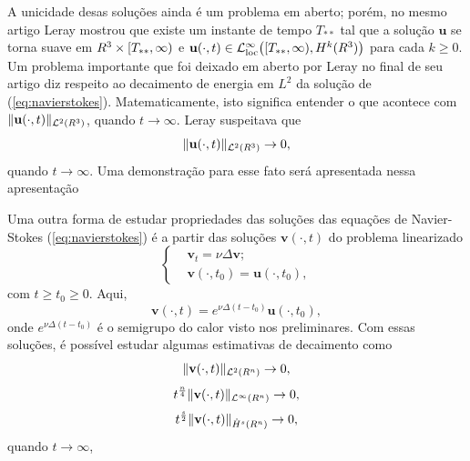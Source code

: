 \documentclass[xcolor=dvipsnames, aspectratio=169, 10pt]{beamer}
\let\mathbb\relax
\newcommand{\bR}{\mathbb{R}}
\newcommand{\bu}{\mathbf{u}}
\newcommand{\bv}{\mathbf{v}}
\newcommand{\cL}{\mathcal{L}}
\newcommand{\loc}{\mathrm{loc}}
\begin{document}
\begin{frame}
    A unicidade desas soluções ainda é um problema em aberto; porém, no mesmo artigo Leray mostrou que existe um instante de tempo $T_{**}$ tal que a solução $\bu$ se torna suave em $\bR^3 \times [T_{**}, \infty)$ e $\bu(\cdot,t) \in \cL^{\infty}_{\loc}\big( [T_{**}, \infty), H^k(\bR^3) \big)$ para cada $k \geqslant 0$.
    Um problema importante que foi deixado em aberto por Leray no final de seu artigo diz respeito ao decaimento de energia em $L^2$ da solução de (\ref{eq:navierstokes}). Matematicamente, isto significa entender o que acontece com $\Vert \bu(\cdot,t) \Vert_{\cL^2(\bR^3)}$, quando $t \to \infty$. Leray suspeitava que
    \[
        \Vert \bu(\cdot,t) \Vert_{\cL^2(\bR^3)} \to 0,
    \]
    quando $t \to \infty$. Uma demonstração para esse fato será apresentada nessa apresentação
\end{frame}
\begin{frame}
    Uma outra forma de estudar propriedades das soluções das equações de Navier-Stokes (\ref{eq:navierstokes}) é a partir das soluções $\bv(\cdot,t)$ do problema linearizado
\begin{equation} \label{eq:navier-stokes-linearizado}
    \left\{
        \begin{aligned}
        &\bv_t = \nu \Delta \bv;\\
        &\bv(\cdot,t_0) = \bu(\cdot,t_0),
    \end{aligned}
    \right.
\end{equation}
com $t \geqslant t_0 \geqslant 0$. Aqui, 
\[
    \bv(\cdot,t) = e^{\nu \Delta (t-t_0)} \bu(\cdot,t_0),
\]
onde $e^{\nu \Delta (t-t_0)}$ é o semigrupo do calor visto nos preliminares.
Com essas soluções, é possível estudar algumas estimativas de decaimento como
\[
    \Vert \bv(\cdot,t) \Vert_{\cL^2(\bR^n)} \to 0,
\]
\[
    t^{\frac{n}{4}}\Vert \bv(\cdot,t) \Vert_{\cL^\infty(\bR^n)} \to 0,
\]
\begin{equation} \label{eq:estimativa-sobolev-homogeneo}
    t^{\frac{s}{2}} \Vert \bv(\cdot,t) \Vert_{\dot{H}^s(\bR^n)} \to 0,
\end{equation}
quando $t \to \infty$,
\end{frame}
\end{document}
